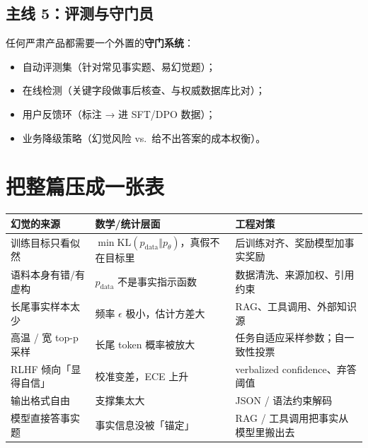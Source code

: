 \documentclass[11pt,a4paper]{ctexart}
\newcommand{\KL}{\mathrm{KL}}
\begin{document}
\subsection{主线 5：评测与守门员}

\begin{engbox}
任何严肃产品都需要一个外置的\textbf{守门系统}：
\begin{itemize}
  \item 自动评测集（针对常见事实题、易幻觉题）；
  \item 在线检测（关键字段做事后核查、与权威数据库比对）；
  \item 用户反馈环（标注 → 进 SFT/DPO 数据）；
  \item 业务降级策略（幻觉风险 vs.\ 给不出答案的成本权衡）。
\end{itemize}
\end{engbox}

\section{把整篇压成一张表}

\begin{center}
\renewcommand{\arraystretch}{1.25}
\begin{tabular}{@{}p{4cm} p{5cm} p{5cm}@{}}
\toprule
\textbf{幻觉的来源} & \textbf{数学/统计层面} & \textbf{工程对策} \\
\midrule
训练目标只看似然 & $\min \KL(p_{\text{data}} \Vert p_\theta)$，真假不在目标里 & 后训练对齐、奖励模型加事实奖励 \\
语料本身有错/有虚构 & $p_{\text{data}}$ 不是事实指示函数 & 数据清洗、来源加权、引用约束 \\
长尾事实样本太少 & 频率 $\epsilon$ 极小，估计方差大 & RAG、工具调用、外部知识源 \\
高温 / 宽 top-p 采样 & 长尾 token 概率被放大 & 任务自适应采样参数；自一致性投票 \\
RLHF 倾向「显得自信」 & 校准变差，ECE 上升 & verbalized confidence、弃答阈值 \\
输出格式自由 & 支撑集太大 & JSON / 语法约束解码 \\
模型直接答事实题 & 事实信息没被「锚定」 & RAG / 工具调用把事实从模型里搬出去 \\
\bottomrule
\end{tabular}
\end{center}

\end{document}
